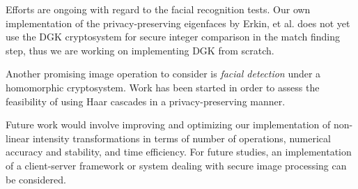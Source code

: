 Efforts are ongoing with regard to the facial recognition tests. Our own implementation of the privacy-preserving eigenfaces by Erkin, et al. does not yet use the DGK cryptosystem for secure integer comparison in the match finding step, thus we are working on implementing DGK from scratch.

Another promising image operation to consider is \textit{facial detection} under a homomorphic cryptosystem. Work has been started in order to assess the feasibility of using Haar cascades in a privacy-preserving manner.

Future work would involve improving and optimizing our implementation of non-linear intensity transformations in terms of number of operations, numerical accuracy and stability, and time efficiency.
For future studies, an implementation of a client-server framework or system dealing with secure image processing can be considered.
